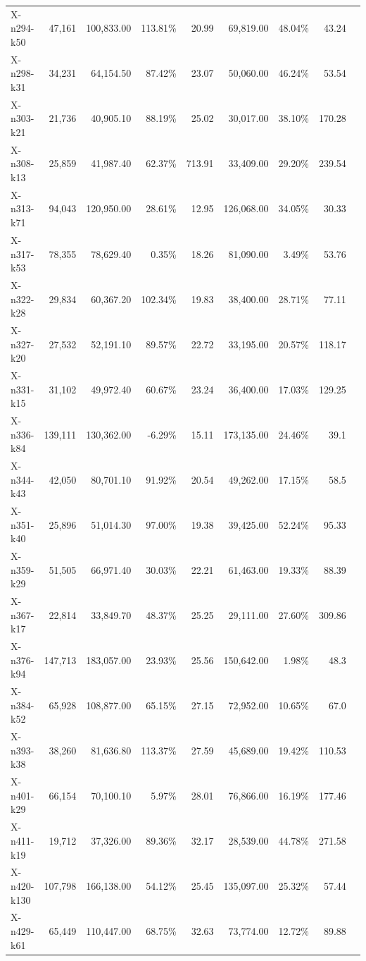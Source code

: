 \documentclass[12pt,a4paper]{article}
\begin{document}
\begin{longtable}{@{}lrrrrrrrr@{}}
    X-n294-k50 & 47,161 & 100,833.00 & 113.81\% & 20.99 & 69,819.00 & 48.04\% & 43.24 \\
    X-n298-k31 & 34,231 & 64,154.50 & 87.42\% & 23.07 & 50,060.00 & 46.24\% & 53.54 \\
    X-n303-k21 & 21,736 & 40,905.10 & 88.19\% & 25.02 & 30,017.00 & 38.10\% & 170.28 \\
    X-n308-k13 & 25,859 & 41,987.40 & 62.37\% & 713.91 & 33,409.00 & 29.20\% & 239.54 \\
    X-n313-k71 & 94,043 & 120,950.00 & 28.61\% & 12.95 & 126,068.00 & 34.05\% & 30.33 \\
    X-n317-k53 & 78,355 & 78,629.40 & 0.35\% & 18.26 & 81,090.00 & 3.49\% & 53.76 \\
    X-n322-k28 & 29,834 & 60,367.20 & 102.34\% & 19.83 & 38,400.00 & 28.71\% & 77.11 \\
    X-n327-k20 & 27,532 & 52,191.10 & 89.57\% & 22.72 & 33,195.00 & 20.57\% & 118.17 \\
    X-n331-k15 & 31,102 & 49,972.40 & 60.67\% & 23.24 & 36,400.00 & 17.03\% & 129.25 \\
    X-n336-k84 & 139,111 & 130,362.00 & -6.29\% & 15.11 & 173,135.00 & 24.46\% & 39.1 \\
    X-n344-k43 & 42,050 & 80,701.10 & 91.92\% & 20.54 & 49,262.00 & 17.15\% & 58.5 \\
    X-n351-k40 & 25,896 & 51,014.30 & 97.00\% & 19.38 & 39,425.00 & 52.24\% & 95.33 \\
    X-n359-k29 & 51,505 & 66,971.40 & 30.03\% & 22.21 & 61,463.00 & 19.33\% & 88.39 \\
    X-n367-k17 & 22,814 & 33,849.70 & 48.37\% & 25.25 & 29,111.00 & 27.60\% & 309.86 \\
    X-n376-k94 & 147,713 & 183,057.00 & 23.93\% & 25.56 & 150,642.00 & 1.98\% & 48.3 \\
    X-n384-k52 & 65,928 & 108,877.00 & 65.15\% & 27.15 & 72,952.00 & 10.65\% & 67.0 \\
    X-n393-k38 & 38,260 & 81,636.80 & 113.37\% & 27.59 & 45,689.00 & 19.42\% & 110.53 \\
    X-n401-k29 & 66,154 & 70,100.10 & 5.97\% & 28.01 & 76,866.00 & 16.19\% & 177.46 \\
    X-n411-k19 & 19,712 & 37,326.00 & 89.36\% & 32.17 & 28,539.00 & 44.78\% & 271.58 \\
    X-n420-k130 & 107,798 & 166,138.00 & 54.12\% & 25.45 & 135,097.00 & 25.32\% & 57.44 \\
    X-n429-k61 & 65,449 & 110,447.00 & 68.75\% & 32.63 & 73,774.00 & 12.72\% & 89.88 \\

\end{longtable}
\end{document}

